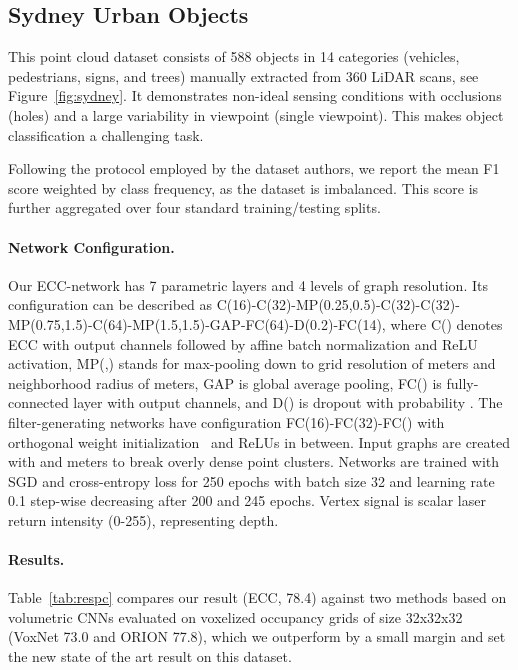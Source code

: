 \documentclass[10pt,twocolumn,letterpaper]{article}
\begin{document}
\subsection{Sydney Urban Objects} \label{subsec:evalpc}

This point cloud dataset \cite{trianglesvm} consists of 588 objects in 14 categories (vehicles, pedestrians, signs, and trees) manually extracted from 360 LiDAR scans, see Figure~\ref{fig:sydney}. It demonstrates non-ideal sensing conditions with occlusions (holes) and a large variability in viewpoint (single viewpoint). This makes object classification a challenging task. 

Following the protocol employed by the dataset authors, we report the mean F1 score weighted by class frequency, as the dataset is imbalanced. This score is further aggregated over four standard training/testing splits.

\paragraph*{Network Configuration.}
Our ECC-network has 7 parametric layers and 4 levels of graph resolution. Its configuration can be described as C(16)-C(32)-MP(0.25,0.5)-C(32)-C(32)-MP(0.75,1.5)-C(64)-MP(1.5,1.5)-GAP-FC(64)-D(0.2)-FC(14), where C() denotes ECC with  output channels followed by affine batch normalization and ReLU activation, MP(,) stands for max-pooling down to grid resolution of  meters and neighborhood radius of  meters, GAP is global average pooling, FC() is fully-connected layer with  output channels, and D() is dropout with probability . The filter-generating networks  have configuration FC(16)-FC(32)-FC() with orthogonal weight initialization~\cite{orthoinit} and ReLUs in between. Input graphs are created with  and  meters to break overly dense point clusters. Networks are trained with SGD and cross-entropy loss for 250 epochs with batch size 32 and learning rate 0.1 step-wise decreasing after 200 and 245 epochs. Vertex signal  is scalar laser return intensity (0-255), representing depth.

\paragraph*{Results.} 
Table~\ref{tab:respc} compares our result (ECC, 78.4) against two methods based on volumetric CNNs evaluated on voxelized occupancy grids of size 32x32x32 (VoxNet \cite{voxnet} 73.0 and ORION \cite{orion} 77.8), which we outperform by a small margin and set the new state of the art result on this dataset. 
\end{document}

